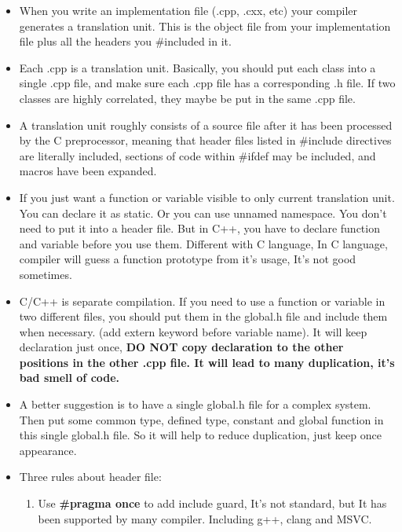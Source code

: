 \documentclass[a4paper,12pt,twoside]{book}
\begin{document}
\begin{itemize}

\item When you write an implementation file (.cpp, .cxx, etc) your compiler generates a translation unit. This is the object file from your implementation file plus all the headers you \#included in it.

\item Each .cpp is a translation unit. Basically, you should put each class into a single .cpp file, and make sure each .cpp file has a corresponding .h file.  If two classes are highly correlated, they maybe be put in the same .cpp file.

\item A translation unit roughly consists of a source file after it has been processed by the C preprocessor, meaning that header files listed in \#include directives are literally included, sections of code within \#ifdef may be included, and macros have been expanded.

\item If you just want a function or variable visible to only current translation unit. You can declare it as static. Or you can use unnamed namespace.  You don't need to put it into a header file.  But in C++, you have to declare function and variable before you use them. Different with C language, In C language, compiler will guess a function prototype from it's usage, It's not good sometimes.

\item C/C++ is separate compilation. If you need to use a function or variable in two different files, you should put them in the  global.h file and include them when necessary. (add extern keyword before variable name).  It will keep declaration just once, \textbf{DO NOT copy declaration to the other positions in the other .cpp file. It will lead to many duplication, it's bad smell of code.}

\item A better suggestion is to have a single global.h file for a complex system. Then put some common type, defined type, constant and global function in this single global.h file. So it will help to reduce duplication, just keep once appearance.

\item Three rules about header file:
\begin{enumerate}
\item Use \textbf{\#pragma once} to add include guard, It's not standard, but It has been supported by many compiler. Including g++, clang and MSVC.


\end{enumerate}
\end{itemize}
\end{document}
